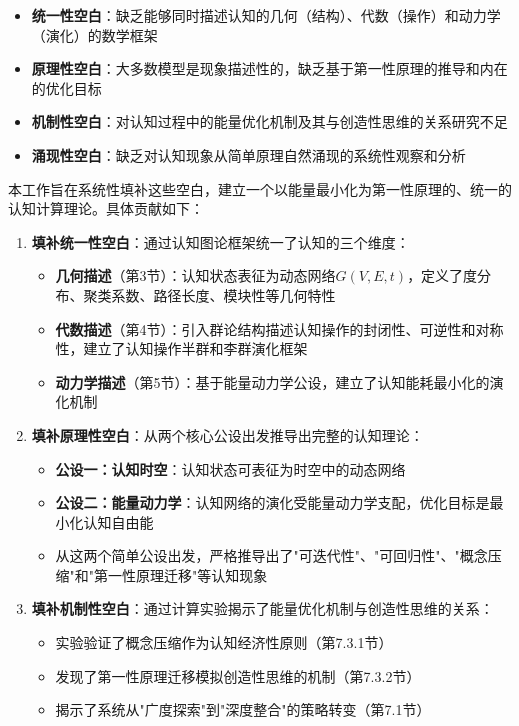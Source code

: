 \documentclass[12pt,a4paper]{article}
\begin{document}
\begin{itemize}
\item \textbf{统一性空白}：缺乏能够同时描述认知的几何（结构）、代数（操作）和动力学（演化）的数学框架
\item \textbf{原理性空白}：大多数模型是现象描述性的，缺乏基于第一性原理的推导和内在的优化目标
\item \textbf{机制性空白}：对认知过程中的能量优化机制及其与创造性思维的关系研究不足
\item \textbf{涌现性空白}：缺乏对认知现象从简单原理自然涌现的系统性观察和分析
\end{itemize}

本工作旨在系统性填补这些空白，建立一个以能量最小化为第一性原理的、统一的认知计算理论。具体贡献如下：

\begin{enumerate}
\item \textbf{填补统一性空白}：通过认知图论框架统一了认知的三个维度：
\begin{itemize}
\item \textbf{几何描述}（第3节）：认知状态表征为动态网络$G(V,E,t)$，定义了度分布、聚类系数、路径长度、模块性等几何特性
\item \textbf{代数描述}（第4节）：引入群论结构描述认知操作的封闭性、可逆性和对称性，建立了认知操作半群和李群演化框架
\item \textbf{动力学描述}（第5节）：基于能量动力学公设，建立了认知能耗最小化的演化机制
\end{itemize}

\item \textbf{填补原理性空白}：从两个核心公设出发推导出完整的认知理论：
\begin{itemize}
\item \textbf{公设一：认知时空}：认知状态可表征为时空中的动态网络
\item \textbf{公设二：能量动力学}：认知网络的演化受能量动力学支配，优化目标是最小化认知自由能
\item 从这两个简单公设出发，严格推导出了"可迭代性"、"可回归性"、"概念压缩"和"第一性原理迁移"等认知现象
\end{itemize}

\item \textbf{填补机制性空白}：通过计算实验揭示了能量优化机制与创造性思维的关系：
\begin{itemize}
\item 实验验证了概念压缩作为认知经济性原则（第7.3.1节）
\item 发现了第一性原理迁移模拟创造性思维的机制（第7.3.2节）
\item 揭示了系统从"广度探索"到"深度整合"的策略转变（第7.1节）
\end{itemize}


\end{enumerate}
\end{document}
